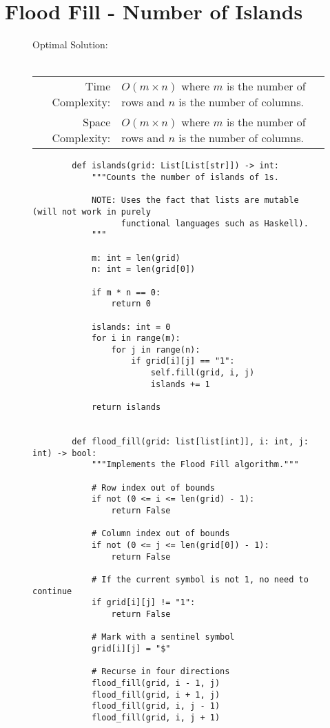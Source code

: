 
\section{Flood Fill - Number of Islands}

\begin{figure}[H]
    Optimal Solution:\\\\
    \begin{tabular}{rl}
        Time Complexity:& \(O(m \times n)\) where \(m\) is the number of rows
        and \(n\) is the number of columns.\\
        Space Complexity:& \(O(m \times n)\) where \(m\) is the number of rows
        and \(n\) is the number of columns.
    \end{tabular}
\end{figure}

\begin{figure}[H]
    \centering
    \begin{verbatim}
        def islands(grid: List[List[str]]) -> int:
            """Counts the number of islands of 1s.

            NOTE: Uses the fact that lists are mutable (will not work in purely
                  functional languages such as Haskell).
            """

            m: int = len(grid)
            n: int = len(grid[0])

            if m * n == 0:
                return 0

            islands: int = 0
            for i in range(m):
                for j in range(n):
                    if grid[i][j] == "1":
                        self.fill(grid, i, j)
                        islands += 1

            return islands


        def flood_fill(grid: list[list[int]], i: int, j: int) -> bool:
            """Implements the Flood Fill algorithm."""

            # Row index out of bounds
            if not (0 <= i <= len(grid) - 1):
                return False

            # Column index out of bounds
            if not (0 <= j <= len(grid[0]) - 1):
                return False

            # If the current symbol is not 1, no need to continue
            if grid[i][j] != "1":
                return False

            # Mark with a sentinel symbol
            grid[i][j] = "$"

            # Recurse in four directions
            flood_fill(grid, i - 1, j)
            flood_fill(grid, i + 1, j)
            flood_fill(grid, i, j - 1)
            flood_fill(grid, i, j + 1)
    \end{verbatim}
\end{figure}
